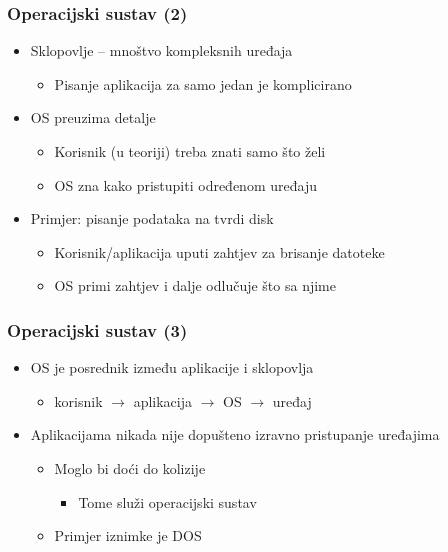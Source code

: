 \documentclass{beamer}
\begin{document}
\begin{frame}[t]
\frametitle{Operacijski sustav (2)}
\begin{itemize}
  \item Sklopovlje – mnoštvo kompleksnih uređaja
   \begin{itemize}
     \item Pisanje aplikacija za samo jedan je komplicirano
   \end{itemize}
  \item OS preuzima detalje
  \begin{itemize}
    \item Korisnik (u teoriji) treba znati samo što želi
    \item OS zna kako pristupiti određenom uređaju
  \end{itemize}
  \item Primjer: pisanje podataka na tvrdi disk
  \begin{itemize}
    \item Korisnik/aplikacija uputi zahtjev za brisanje datoteke
    \item OS primi zahtjev i dalje odlučuje što sa njime
  \end{itemize}
\end{itemize}
\end{frame}

\begin{frame}[t]
\frametitle{Operacijski sustav (3)}
\begin{itemize}
  \item OS je posrednik između aplikacije i sklopovlja
  \begin{itemize}
    \item korisnik $\rightarrow$ aplikacija $\rightarrow$ OS
          $\rightarrow$ uređaj
  \end{itemize}
  \item Aplikacijama nikada nije dopušteno izravno pristupanje uređajima
  \begin{itemize}
    \item Moglo bi doći do kolizije
    \begin{itemize}
      \item Tome služi operacijski sustav
    \end{itemize}
    \item Primjer iznimke je DOS
  \end{itemize}
\end{itemize}
\end{frame}
\end{document}
